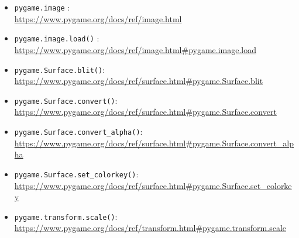 \begin{itemize}
\item \texttt{pygame.image}
:\\
\url{https://www.pygame.org/docs/ref/image.html}

\item \texttt{pygame.image.load()}
:\\
\url{https://www.pygame.org/docs/ref/image.html#pygame.image.load}

\item \texttt{pygame.Surface.blit()}:
\\
\url{https://www.pygame.org/docs/ref/surface.html#pygame.Surface.blit}

\item \texttt{pygame.Surface.convert()}:
\\
\url{https://www.pygame.org/docs/ref/surface.html#pygame.Surface.convert}

\item \texttt{pygame.Surface.convert\_alpha()}:
\\
\url{https://www.pygame.org/docs/ref/surface.html#pygame.Surface.convert\_alpha}

\item \texttt{pygame.Surface.set\_colorkey()}:
\\
\url{https://www.pygame.org/docs/ref/surface.html#pygame.Surface.set\_colorkey}

\item \texttt{pygame.transform.scale()}:
\\
\url{https://www.pygame.org/docs/ref/transform.html#pygame.transform.scale}

\end{itemize}

